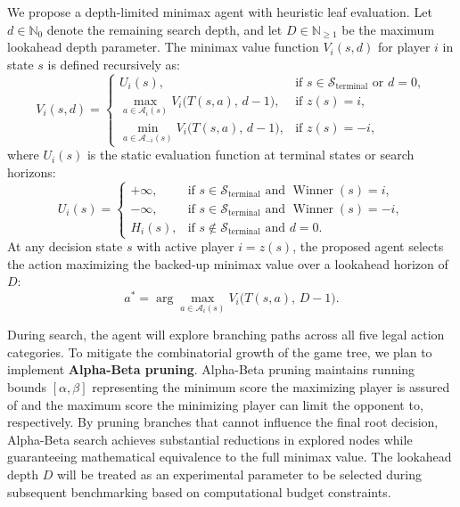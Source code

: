 \documentclass{article}
\begin{document}
We propose a depth-limited minimax agent with heuristic leaf evaluation. Let $d \in \mathbb{N}_0$ denote the remaining search depth, and let $D \in \mathbb{N}_{\ge 1}$ be the maximum lookahead depth parameter. The minimax value function $V_i(s, d)$ for player $i$ in state $s$ is defined recursively as:
\begin{equation}
V_i(s, d) = \begin{cases}
U_i(s), & \text{if } s \in \mathcal{S}_{\text{terminal}} \text{ or } d = 0, \\
\max\limits_{a \in \mathcal{A}_i(s)} V_i\big(T(s, a), \, d - 1\big), & \text{if } z(s) = i, \\
\min\limits_{a \in \mathcal{A}_{-i}(s)} V_i\big(T(s, a), \, d - 1\big), & \text{if } z(s) = -i,
\end{cases}
\end{equation}
where $U_i(s)$ is the static evaluation function at terminal states or search horizons:
\begin{equation}
U_i(s) = \begin{cases}
+\infty, & \text{if } s \in \mathcal{S}_{\text{terminal}} \text{ and } \operatorname{Winner}(s) = i, \\
-\infty, & \text{if } s \in \mathcal{S}_{\text{terminal}} \text{ and } \operatorname{Winner}(s) = -i, \\
H_i(s), & \text{if } s \notin \mathcal{S}_{\text{terminal}} \text{ and } d = 0.
\end{cases}
\end{equation}
At any decision state $s$ with active player $i = z(s)$, the proposed agent selects the action maximizing the backed-up minimax value over a lookahead horizon of $D$:
\begin{equation}
a^* = \arg\max_{a \in \mathcal{A}_i(s)} V_i\big(T(s, a), \, D - 1\big).
\end{equation}

During search, the agent will explore branching paths across all five legal action categories. To mitigate the combinatorial growth of the game tree, we plan to implement \textbf{Alpha-Beta pruning}. Alpha-Beta pruning maintains running bounds $[\alpha, \beta]$ representing the minimum score the maximizing player is assured of and the maximum score the minimizing player can limit the opponent to, respectively. By pruning branches that cannot influence the final root decision, Alpha-Beta search achieves substantial reductions in explored nodes while guaranteeing mathematical equivalence to the full minimax value. The lookahead depth $D$ will be treated as an experimental parameter to be selected during subsequent benchmarking based on computational budget constraints.
\end{document}
